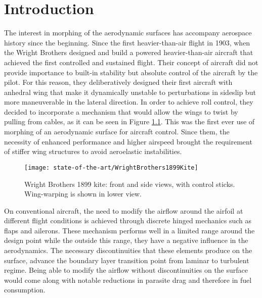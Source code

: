 \chapter{Introduction} \label{chap:introduction}


The interest in morphing of the aerodynamic surfaces has accompany aerospace history since the beginning. Since the first heavier-than-air flight in 1903, when the Wright Brothers designed and build a powered heavier-than-air aircraft that achieved the  first controlled and sustained flight. Their concept of aircraft did not provide importance to built-in stability but absolute control of the aircraft by the pilot. For this reason, they deliberatively designed their first aircraft with anhedral wing that make it dynamically unstable to perturbations in sideslip but more maneuverable in the lateral direction. In order to achieve roll control, they decided to incorporate a mechanism that would allow the wings to twist by pulling from cables, as it can be seen in Figure \ref{fig:Wright}. This was the first ever use of morphing of an aerodynamic surface for aircraft control. Since them, the necessity of enhanced performance and higher airspeed brought the requirement of stiffer wing structures to avoid aeroelastic instabilities.

\begin{figure}[!htpb]
  \centering
  \texttt{[image: state-of-the-art/WrightBrothers1899Kite]}
  \caption[Wright Brothers 1899 kite]{Wright Brothers 1899 kite: front and side views, with control sticks. Wing-warping is shown in lower view. \cite{Wright}}\label{fig:Wright}
\end{figure}

On conventional aircraft, the need to modify the airflow around the airfoil at different flight conditions is achieved through discrete hinged mechanics such as flaps and ailerons. These mechanism performs well in a limited range around the design point while the outside this range, they have a negative influence in the aerodynamics. The necessary discontinuities that these elements produce on the surface, advance the boundary layer transition point from laminar to turbulent regime. Being able to modify the airflow without discontinuities on the surface would come along with notable reductions in parasite drag and therefore in fuel consumption.

